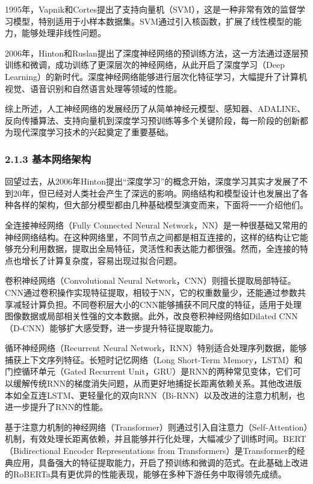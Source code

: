 1995年，Vapnik和Cortes提出了支持向量机（SVM），这是一种非常有效的监督学习模型，特别适用于小样本数据集。SVM通过引入核函数，扩展了线性模型的能力，能够处理非线性问题。

2006年，Hinton和Ruslan提出了深度神经网络的预训练方法，这一方法通过逐层预训练和微调，成功训练了更深层次的神经网络，从此开启了深度学习（Deep
Learning）的新时代。深度神经网络能够进行层次化特征学习，大幅提升了计算机视觉、语音识别和自然语言处理等领域的性能。

综上所述，人工神经网络的发展经历了从简单神经元模型、感知器、ADALINE、反向传播算法、支持向量机到深度学习预训练等多个关键阶段，每一阶段的创新都为现代深度学习技术的兴起奠定了重要基础。

\subsubsection{\texorpdfstring{\textbf{2.1.3
基本网络架构}}{2.1.3 基本网络架构}}\label{213-ux57faux672cux7f51ux7edcux67b6ux6784}

回望过去，从2006年Hinton提出``深度学习''的概念开始，深度学习其实才发展了不到20年，但已经对人类社会产生了深远的影响。网络结构和模型设计也发展出了各种各样的架构，但大部分模型都由几种基础模型演变而来，下面将一一介绍他们。

全连接神经网络（Fully Connected Neural
Network，NN）是一种很基础又常用的神经网络结构。在这种网络里，不同节点之间都是相互连接的，这样的结构让它能够充分利用数据，提取出全局特征，灵活性和表达能力都很强。然而，全连接的特点也增长了计算复杂度，容易出现过拟合问题。

卷积神经网络（Convolutional Neural
Network，CNN）则擅长提取局部特征。CNN通过卷积操作实现特征提取，相较于NN，它的权重数量少，还能通过参数共享减轻计算负担。不同卷积层大小的CNN能够捕获不同尺度的特征，适用于处理图像数据或局部相关性强的文本数据。此外，改良卷积神经网络如Dilated
CNN（D-CNN）能够扩大感受野，进一步提升特征提取能力。

循环神经网络（Recurrent Neural
Network，RNN）特别适合处理序列数据，能够捕获上下文序列特征。长短时记忆网络（Long
Short-Term Memory，LSTM）和门控循环单元（Gated Recurrent
Unit，GRU）是RNN的两种常见变体，它们可以缓解传统RNN的梯度消失问题，从而更好地捕捉长距离依赖关系。其他改进版本如全互连LSTM、更轻量化的双向RNN（Bi-RNN）以及改进的注意力机制，也进一步提升了RNN的性能。

基于注意力机制的神经网络（Transformer）则通过引入自注意力（Self-Attention）机制，有效处理长距离依赖，并且能够并行化处理，大幅减少了训练时间。BERT（Bidirectional
Encoder Representations from
Transformers）是Transformer的经典应用，具备强大的特征提取能力，开启了预训练和微调的范式。在此基础上改进的RoBERTa具有更优异的性能表现，能够在多种下游任务中取得领先成绩。

